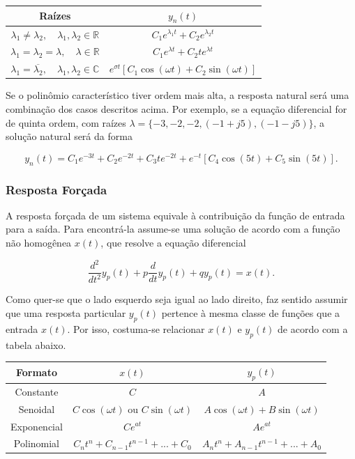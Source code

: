 \documentclass{article}
\numberwithin{equation}{section}
\let\dfr\dfrac
\begin{document}
\begin{center}
    \begin{tabular}{|c|c|}
        \hline
        Raízes & $y_n(t)$
        \\ \hline
        $\lambda_1 \neq \lambda_2, \quad \lambda_1,\lambda_2 \in \mathbb{R}$ & $C_1e^{\lambda_1 t}+C_2e^{\lambda_2 t}$
        \\ \hline
        $\lambda_1 = \lambda_2 = \lambda, \quad \lambda \in \mathbb{R}$ & $C_1e^{\lambda t}+C_2te^{\lambda t}$
        \\ \hline
        $\lambda_1 = \overline{\lambda_2}, \quad \lambda_1,\lambda_2 \in \mathbb{C}$ & $e^{\sigma t}[C_1\cos(\omega t)+C_2\sin(\omega t)]$
        \\ \hline
    \end{tabular}
\end{center}

Se o polinômio característico tiver ordem mais alta, a resposta natural será uma combinação dos casos descritos acima. Por exemplo, se a equação diferencial for de quinta ordem, com raízes $\lambda=\{-3,-2,-2,(-1+j5),(-1-j5)\}$, a solução natural será da forma

\begin{equation*}
    y_n(t) = C_1e^{-3t} + C_2e^{-2t}+ C_3te^{-2t} + e^{-t}[C_4\cos(5t) + C_5\sin(5t)].
\end{equation*}

\subsubsection{Resposta Forçada}
\label{subsubsec:forçada}
A resposta forçada de um sistema equivale à contribuição da função de entrada para a saída. Para encontrá-la assume-se uma solução de acordo com a função não homogênea $x(t)$, que resolve a equação diferencial

\begin{equation*}
    \dfr{d^2}{dt^2}y_p(t)+p\frac{d}{dt}y_p(t)+qy_p(t)=x(t).
\end{equation*}

Como quer-se que o lado esquerdo seja igual ao lado direito, faz sentido assumir que uma resposta particular $y_p(t)$ pertence à mesma classe de funções que a entrada $x(t)$. Por isso, costuma-se relacionar $x(t)$ e $y_{p}(t)$ de acordo com a tabela abaixo.
\begin{center}
        \begin{tabular}{|c|c|c|} \hline
        Formato & $x(t)$ & $y_{p}(t)$ \\ \hline
        Constante & $C$ & $A$ \\ \hline
        Senoidal & $C\cos(\omega t)$ ou $C\sin(\omega t)$ & $A\cos(\omega t) + B\sin(\omega t)$ \\ \hline
        Exponencial & $Ce^{at}$ & $Ae^{at}$ \\ \hline
        Polinomial & $C_{n}t^{n} + C_{n-1}t^{n-1} + ... + C_{0}$ & $A_{n}t^{n} + A_{n-1}t^{n-1} + ... + A_{0}$ \\ \hline
    \end{tabular}
\end{center}
\end{document}
